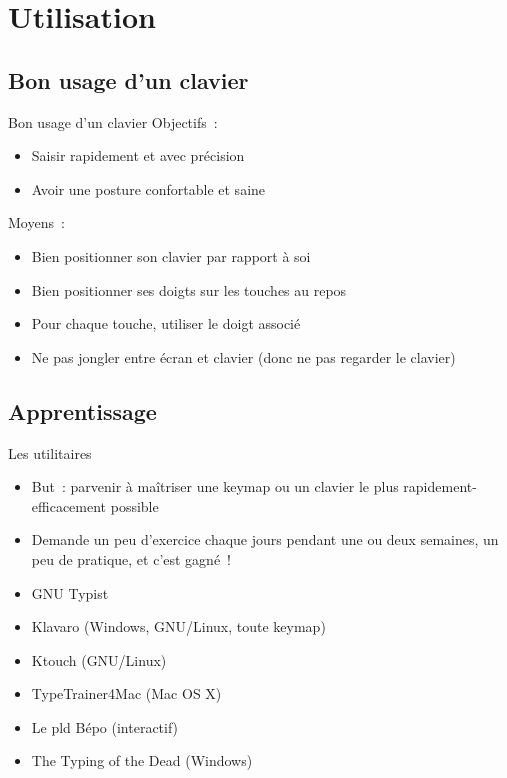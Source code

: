 \section{Utilisation}



\subsection{Bon usage d’un clavier}

\begin{frame}{Bon usage d’un clavier}
    Objectifs~:
    \begin{itemize}
        \item Saisir rapidement et avec précision \pause

        \item Avoir une posture confortable et saine
    \end{itemize}
    \pause

    Moyens~:
    \begin{itemize}
        \item Bien positionner son clavier par rapport à soi \pause

        \item Bien positionner ses doigts sur les touches au repos \pause

        \item Pour chaque touche, utiliser le doigt associé \pause

        \item Ne pas jongler entre écran et clavier (donc ne pas regarder le clavier)
    \end{itemize}
\end{frame}



\subsection{Apprentissage}

\begin{frame}{Les utilitaires}
    \begin{itemize}
        \item But~: parvenir à maîtriser une keymap ou un clavier le plus
          rapidement-efficacement possible \pause
        \item Demande un peu d’exercice chaque jours pendant une ou deux
          semaines, un peu de pratique, et c’est gagné~! \pause

        \item GNU Typist \pause
        \item Klavaro (Windows, GNU/Linux, toute keymap) \pause
        \item Ktouch (GNU/Linux) \pause
        \item TypeTrainer4Mac (Mac OS X) \pause
	    \item Le pld Bépo (interactif) \pause
		\item The Typing of the Dead (Windows)
    \end{itemize}
\end{frame}

